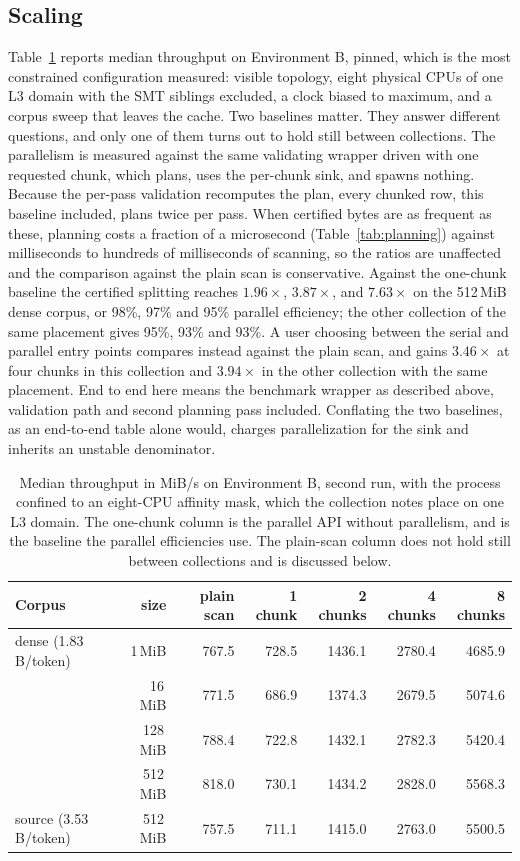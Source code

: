 \documentclass[11pt,a4paper]{article}
\theoremstyle{definition}
\theoremstyle{plain}
\begin{document}
\subsection{Scaling}

Table~\ref{tab:scaling} reports median throughput on Environment B, pinned, which is the most constrained configuration
measured: visible topology, eight physical CPUs of one L3 domain with the SMT siblings excluded, a clock biased to
maximum, and a corpus sweep that leaves the cache. Two baselines matter. They answer different questions, and only one
of them turns out to hold still between collections. The parallelism is measured against the same validating wrapper
driven with one requested chunk, which plans, uses the per-chunk sink, and spawns nothing. Because the per-pass
validation recomputes the plan, every chunked row, this baseline included, plans twice per pass. When certified bytes
are as frequent as these, planning costs a fraction of a microsecond (Table~\ref{tab:planning}) against milliseconds to
hundreds of milliseconds of scanning, so the ratios are unaffected and the comparison against the plain scan is
conservative. Against the one-chunk baseline the certified splitting reaches $1.96\times$, $3.87\times$, and
$7.63\times$ on the 512\,MiB dense corpus, or 98\%, 97\% and 95\% parallel efficiency; the other collection of the same
placement gives 95\%, 93\% and 93\%. A user choosing between the serial and parallel entry points compares instead
against the plain scan, and gains $3.46\times$ at four chunks in this collection and $3.94\times$ in the other
collection with the same placement. End to end here means the benchmark wrapper as described above, validation path and
second planning pass included. Conflating the two baselines, as an end-to-end table alone would, charges parallelization
for the sink and inherits an unstable denominator.

\begin{table}[!ht]
\centering
\begin{tabular}{lrrrrrr}
\toprule
Corpus & size & plain scan & 1 chunk & 2 chunks & 4 chunks & 8 chunks \\
\midrule
dense (1.83 B/token)  & 1\,MiB    & 767.5 & 728.5 & 1436.1 & 2780.4 & 4685.9 \\
                      & 16\,MiB   & 771.5 & 686.9 & 1374.3 & 2679.5 & 5074.6 \\
                      & 128\,MiB  & 788.4 & 722.8 & 1432.1 & 2782.3 & 5420.4 \\
                      & 512\,MiB  & 818.0 & 730.1 & 1434.2 & 2828.0 & 5568.3 \\
\midrule
source (3.53 B/token) & 512\,MiB  & 757.5 & 711.1 & 1415.0 & 2763.0 & 5500.5 \\
\bottomrule
\end{tabular}
\caption{Median throughput in MiB/s on Environment B, second run, with the process confined to an eight-CPU affinity
mask, which the collection notes place on one L3 domain. The one-chunk column is the parallel API without parallelism,
and is the baseline the parallel efficiencies use. The plain-scan column does not hold still between collections and is
discussed below.}
\label{tab:scaling}
\end{table}
\end{document}
